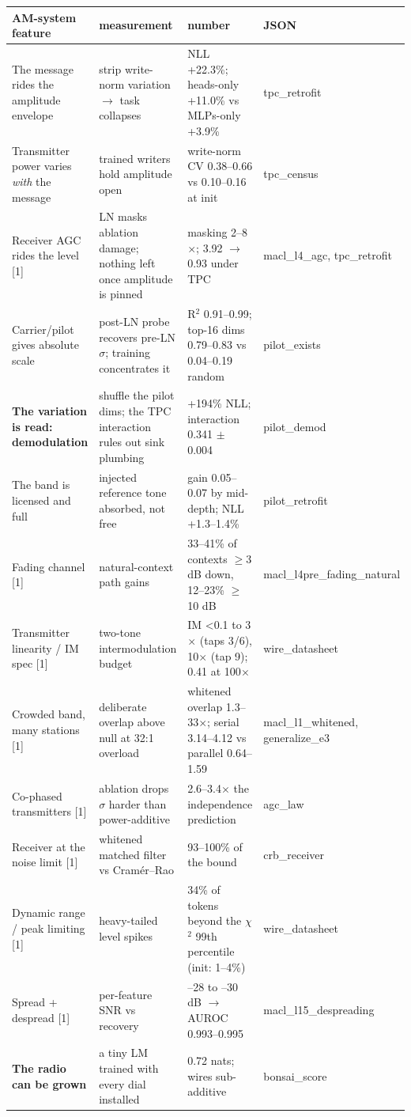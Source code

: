 \documentclass[10pt]{article}
\begin{document}
\begin{center}\small\begin{tabular}{llll}
\toprule
AM-system feature & measurement & number & JSON \\
\midrule
The message rides the amplitude envelope & strip write-norm variation $\to$ task collapses & NLL +22.3\%; heads-only +11.0\% vs MLPs-only +3.9\% & tpc\_retrofit \\
Transmitter power varies \emph{with} the message & trained writers hold amplitude open & write-norm CV 0.38--0.66 vs 0.10--0.16 at init & tpc\_census \\
Receiver AGC rides the level [1] & \parbox[t]{0.23\linewidth}{LN masks ablation damage; nothing left once amplitude is pinned} & masking 2--8$\times$; 3.92 $\to$ 0.93 under TPC & macl\_l4\_agc, tpc\_retrofit \\
Carrier/pilot gives absolute scale & post-LN probe recovers pre-LN $\sigma$; training concentrates it & R$^{2}$ 0.91--0.99; top-16 dims 0.79--0.83 vs 0.04--0.19 random & pilot\_exists \\
\textbf{The variation is read: demodulation} & \parbox[t]{0.23\linewidth}{shuffle the pilot dims; the TPC interaction rules out sink plumbing} & +194\% NLL; interaction 0.341 $\pm$ 0.004 & pilot\_demod \\
The band is licensed and full & injected reference tone absorbed, not free & gain 0.05--0.07 by mid-depth; NLL +1.3--1.4\% & pilot\_retrofit \\
Fading channel [1] & natural-context path gains & 33--41\% of contexts $\ge$3 dB down, 12--23\% $\ge$10 dB & macl\_l4pre\_fading\_natural \\
Transmitter linearity / IM spec [1] & two-tone intermodulation budget & IM <0.1 to 3$\times$ (taps 3/6), 10$\times$ (tap 9); 0.41 at 100$\times$ & wire\_datasheet \\
Crowded band, many stations [1] & deliberate overlap above null at 32:1 overload & \parbox[t]{0.23\linewidth}{whitened overlap 1.3--33$\times$; serial 3.14--4.12 vs parallel 0.64--1.59} & macl\_l1\_whitened, generalize\_e3 \\
Co-phased transmitters [1] & ablation drops $\sigma$ harder than power-additive & 2.6--3.4$\times$ the independence prediction & agc\_law \\
Receiver at the noise limit [1] & whitened matched filter vs Cramér--Rao & 93--100\% of the bound & crb\_receiver \\
Dynamic range / peak limiting [1] & heavy-tailed level spikes & 34\% of tokens beyond the $\chi$$^{2}$ 99th percentile (init: 1--4\%) & wire\_datasheet \\
Spread + despread [1] & per-feature SNR vs recovery & --28 to --30 dB $\to$ AUROC 0.993--0.995 & macl\_l15\_despreading \\
\textbf{The radio can be grown} & a tiny LM trained with every dial installed & 0.72 nats; wires sub-additive & bonsai\_score \\
\bottomrule
\end{tabular}\end{center}
\end{document}
